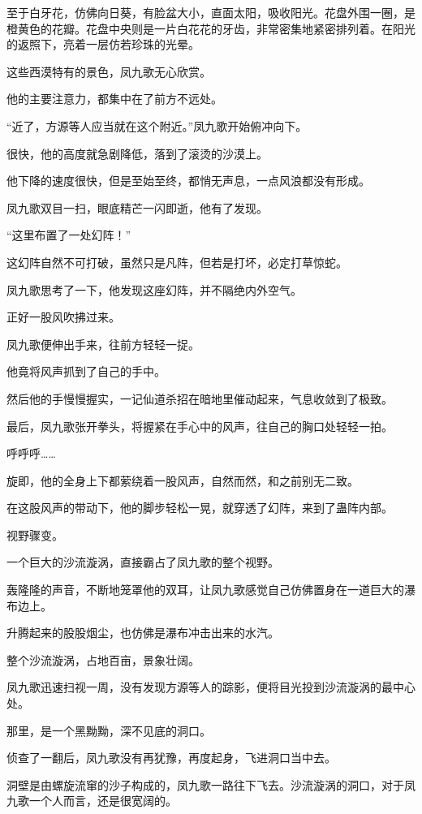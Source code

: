 \begin{this_body}
至于白牙花，仿佛向日葵，有脸盆大小，直面太阳，吸收阳光。花盘外围一圈，是橙黄色的花瓣。花盘中央则是一片白花花的牙齿，非常密集地紧密排列着。在阳光的返照下，亮着一层仿若珍珠的光晕。

这些西漠特有的景色，凤九歌无心欣赏。

他的主要注意力，都集中在了前方不远处。

“近了，方源等人应当就在这个附近。”凤九歌开始俯冲向下。

很快，他的高度就急剧降低，落到了滚烫的沙漠上。

他下降的速度很快，但是至始至终，都悄无声息，一点风浪都没有形成。

凤九歌双目一扫，眼底精芒一闪即逝，他有了发现。

“这里布置了一处幻阵！”

这幻阵自然不可打破，虽然只是凡阵，但若是打坏，必定打草惊蛇。

凤九歌思考了一下，他发现这座幻阵，并不隔绝内外空气。

正好一股风吹拂过来。

凤九歌便伸出手来，往前方轻轻一捉。

他竟将风声抓到了自己的手中。

然后他的手慢慢握实，一记仙道杀招在暗地里催动起来，气息收敛到了极致。

最后，凤九歌张开拳头，将握紧在手心中的风声，往自己的胸口处轻轻一拍。

呼呼呼……

旋即，他的全身上下都萦绕着一股风声，自然而然，和之前别无二致。

在这股风声的带动下，他的脚步轻松一晃，就穿透了幻阵，来到了蛊阵内部。

视野骤变。

一个巨大的沙流漩涡，直接霸占了凤九歌的整个视野。

轰隆隆的声音，不断地笼罩他的双耳，让凤九歌感觉自己仿佛置身在一道巨大的瀑布边上。

升腾起来的股股烟尘，也仿佛是瀑布冲击出来的水汽。

整个沙流漩涡，占地百亩，景象壮阔。

凤九歌迅速扫视一周，没有发现方源等人的踪影，便将目光投到沙流漩涡的最中心处。

那里，是一个黑黝黝，深不见底的洞口。

侦查了一翻后，凤九歌没有再犹豫，再度起身，飞进洞口当中去。

洞壁是由螺旋流窜的沙子构成的，凤九歌一路往下飞去。沙流漩涡的洞口，对于凤九歌一个人而言，还是很宽阔的。


\end{this_body}
